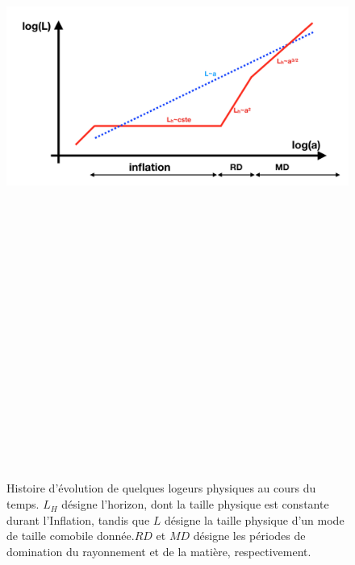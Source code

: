 \begin{figure}[htbp]
	\centering
		\includegraphics[height=25cm]{figs/inflation.png}
	\caption[Histoire d'évolution de quelques longueurs physiques au cours du temps.]{Histoire d'évolution de quelques logeurs physiques au cours du temps. $L_H$ désigne l'horizon, dont la taille physique est constante durant l'Inflation, tandis que $L$ désigne la taille physique d'un mode de taille comobile donnée.$RD$ et $MD$ désigne les périodes de domination du rayonnement et de la matière, respectivement. }
	\label{f:inflation}
\end{figure}

